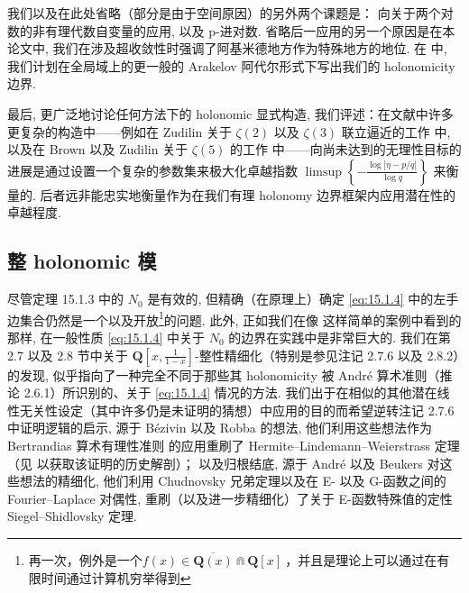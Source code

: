 我们以及在此处省略（部分是由于空间原因）的另外两个课题是： 
向关于两个对数的非有理代数自变量的应用, 
以及 p-进对数. 
省略后一应用的另一个原因是在本论文中, 
我们在涉及超收敛性时强调了阿基米德地方作为特殊地方的地位. 
在 \cite{CDT24} 中, 我们计划在全局域上的更一般的 Arakelov 阿代尔形式下写出我们的 holonomicity 边界.

最后, 更广泛地讨论任何方法下的 holonomic 显式构造, 
我们评述：在文献中许多更复杂的构造中——例如在 Zudilin 关于 \(\zeta(2)\) 以及 \(\zeta(3)\) 联立逼近的工作 \cite{Zud14} 中, 
以及在 Brown 以及 Zudilin 关于 \(\zeta(5)\) 的工作 \cite{BZ22} 中——向尚未达到的无理性目标的进展是通过设置一个复杂的参数集来极大化卓越指数 \(\limsup \left\{-\frac{\log |\eta - p/q|}{\log q}\right\}\) 
来衡量的. 
后者远非能忠实地衡量作为在我们有理 holonomy 边界框架内应用潜在性的卓越程度.

\subsection{整 holonomic 模}\label{sec:15.2}

尽管定理 15.1.3 中的 \(N_0\) 是有效的, 
但精确（在原理上）确定 \eqref{eq:15.1.4} 中的左手边集合仍然是一个以及开放\footnote{再一次，例外是一个$f(x)\in \overline{\mathbf{Q}(x)} \Cap \mathbf{Q}[x]\ $，并且是理论上可以通过在有限时间通过计算机穷举得到}的问题. 
此外, 正如我们在像 \cite{Hat98} 这样简单的案例中看到的那样, 
在一般性质 \eqref{eq:15.1.4} 中关于 \(N_0\) 的边界在实践中是非常巨大的. 
我们在第 2.7 以及 2.8 节中关于 \(\mathbf{Q}\left[x, \frac{1}{1-x}\right]\)-整性精细化（特别是参见注记 2.7.6 以及 2.8.2）的发现, 
似乎指向了一种完全不同于那些其 holonomicity 被 Andr{\'e} 算术准则（推论 2.6.1）所识别的、关于 \eqref{eq:15.1.4} 情况的方法. 
我们出于在相似的其他潜在线性无关性设定（其中许多仍是未证明的猜想）中应用的目的而希望逆转注记 2.7.6 中证明逻辑的启示, 
源于 B{\'e}zivin 以及 Robba \cite{BR89} 的想法, 
他们利用这些想法作为 Bertrandias 算术有理性准则 \cite[定理 5.4.6]{Ami75} 的应用重刷了 Hermite--Lindemann--Weierstrass 定理（见 \cite{BBR90} 以获取该证明的历史解剖）； 
以及归根结底, 源于 Andr{\'e} \cite{And00a}\cite{And00b} 以及 Beukers \cite{Beu06} 对这些想法的精细化, 
他们利用 Chudnovsky 兄弟定理以及在 E- 以及 G-函数之间的 Fourier--Laplace 对偶性, 
重刷（以及进一步精细化）了关于 E-函数特殊值的定性 Siegel--Shidlovsky 定理.

